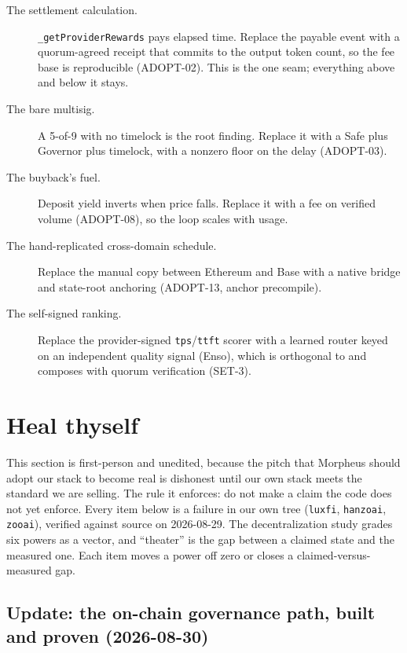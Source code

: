 \documentclass[11pt,a4paper]{article}
\newcommand{\code}[1]{\texttt{\small #1}}
\begin{document}
\begin{description}
  \item[The settlement calculation.] \code{\_getProviderRewards} pays elapsed time. Replace the
    payable event with a quorum-agreed receipt that commits to the output token count, so the
    fee base is reproducible (ADOPT-02). This is the one seam; everything above and below it
    stays.
  \item[The bare multisig.] A 5-of-9 with no timelock is the root finding. Replace it with a
    Safe plus Governor plus timelock, with a nonzero floor on the delay (ADOPT-03).
  \item[The buyback's fuel.] Deposit yield inverts when price falls. Replace it with a fee on
    verified volume (ADOPT-08), so the loop scales with usage.
  \item[The hand-replicated cross-domain schedule.] Replace the manual copy between Ethereum and
    Base with a native bridge and state-root anchoring (ADOPT-13, anchor precompile).
  \item[The self-signed ranking.] Replace the provider-signed \code{tps}/\code{ttft} scorer with
    a learned router keyed on an independent quality signal (Enso), which is orthogonal to and
    composes with quorum verification (SET-3).
\end{description}

\section{Heal thyself}
\label{sec:heal}

This section is first-person and unedited, because the pitch that Morpheus should adopt our
stack to become real is dishonest until our own stack meets the standard we are selling. The
rule it enforces: do not make a claim the code does not yet enforce. Every item below is a
failure in our own tree (\code{luxfi}, \code{hanzoai}, \code{zooai}), verified against source on
2026-08-29. The decentralization study grades six powers as a vector, and ``theater'' is the gap
between a claimed state and the measured one. Each item moves a power off zero or closes a
claimed-versus-measured gap.

\subsection{Update: the on-chain governance path, built and proven (2026-08-30)}
\end{document}
